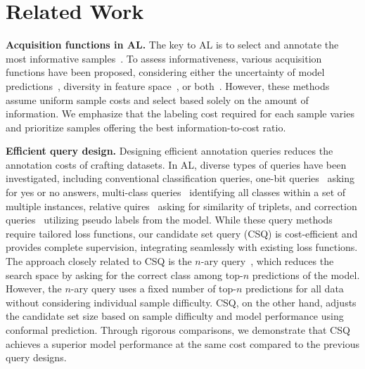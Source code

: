 \section{Related Work}

\textbf{Acquisition functions in AL.}
The key to AL is to select and annotate the most informative samples~\cite{settles2009active, dasgupta2011two, hanneke2014theory}.
To assess informativeness,
various acquisition functions have been proposed, considering either the uncertainty of model predictions~\citep{asghar2016deep, he2019towards, ostapuk2019activelink,fuchsgruber2024uncertainty,kim2024active,cho2024querying,kim2023saal}, diversity in feature space~\citep{sener2017active, sinha2019variational,yehuda2022active}, or both~\citep{ash2019deep, hwang2022combating, wang2015querying, wang2019incorporating,hacohen2022active,NEURIPS2023_2b09bb02, hacohen2023select}.
However, these methods assume uniform sample costs and select based solely on the amount of information. We emphasize that the labeling cost required for each sample varies and prioritize samples offering the best information-to-cost ratio.

\textbf{Efficient query design.}
Designing efficient annotation queries reduces the annotation costs of crafting datasets.
In AL, diverse types of queries have been investigated, including conventional classification queries, one-bit queries~\citep{hu2020one, joshi2010breaking} asking for yes or no answers, multi-class queries~\citep{hwang2023active} identifying all classes within a set of multiple instances, relative quires~\citep{qian2013active} asking for similarity of triplets, and correction queries~\citep{kim2024active} utilizing pseudo labels from the model.
While these query methods require tailored loss functions, our candidate set query (CSQ) is cost-efficient and provides complete supervision, integrating seamlessly with existing loss functions.
The approach closely related to CSQ is the $n$-ary query~\citep{bhattacharya2019active}, which reduces the search space by asking for the correct class among top-$n$ predictions of the model.
However, the $n$-ary query uses a fixed number of top-$n$ predictions for all data without considering individual sample difficulty.
CSQ, on the other hand, adjusts the candidate set size based on sample difficulty and model performance using conformal prediction.
Through rigorous comparisons, we demonstrate that CSQ achieves a superior model performance at the same cost compared to the previous query designs.

